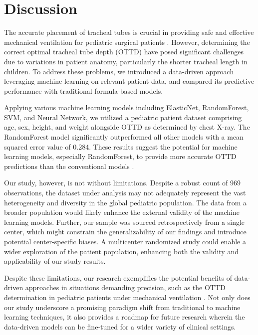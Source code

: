 \documentclass[11pt]{article}
\begin{document}
\section*{Discussion}

The accurate placement of tracheal tubes is crucial in providing safe and effective mechanical ventilation for pediatric surgical patients \cite{Tsoulfanidis1983MeasurementAD, Bernstein1998IsBT}. However, determining the correct optimal tracheal tube depth (OTTD) have posed significant challenges due to variations in patient anatomy, particularly the shorter tracheal length in children. To address these problems, we introduced a data-driven approach leveraging machine learning on relevant patient data, and compared its predictive performance with traditional formula-based models. 

Applying various machine learning models including ElasticNet, RandomForest, SVM, and Neural Network, we utilized a pediatric patient dataset comprising age, sex, height, and weight alongside OTTD as determined by chest X-ray. The RandomForest model significantly outperformed all other models with a mean squared error value of 0.284. These results suggest the potential for machine learning models, especially RandomForest, to provide more accurate OTTD predictions than the conventional models \cite{Tareerath2021AccuracyOA}.

Our study, however, is not without limitations. Despite a robust count of 969 observations, the dataset under analysis may not adequately represent the vast heterogeneity and diversity in the global pediatric population. The data from a broader population would likely enhance the external validity of the machine learning models. Further, our sample was sourced retrospectively from a single center, which might constrain the generalizability of our findings and introduce potential center-specific biases. A multicenter randomized study could enable a wider exploration of the patient population, enhancing both the validity and applicability of our study results.

Despite these limitations, our research exemplifies the potential benefits of data-driven approaches in situations demanding precision, such as the OTTD determination in pediatric patients under mechanical ventilation \cite{Gadek1999EffectOE}. Not only does our study underscore a promising paradigm shift from traditional to machine learning techniques, it also provides a roadmap for future research wherein the data-driven models can be fine-tuned for a wider variety of clinical settings.
\end{document}
